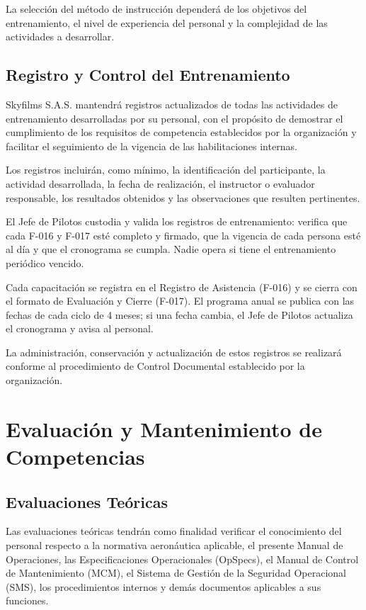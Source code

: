 La selección del método de instrucción dependerá de los objetivos del entrenamiento, el nivel de experiencia del personal y la complejidad de las actividades a desarrollar.




\subsection{Registro y Control del Entrenamiento}

Skyfilms S.A.S. mantendrá registros actualizados de todas las actividades de entrenamiento desarrolladas por su personal, con el propósito de demostrar el cumplimiento de los requisitos de competencia establecidos por la organización y facilitar el seguimiento de la vigencia de las habilitaciones internas.

Los registros incluirán, como mínimo, la identificación del participante, la actividad desarrollada, la fecha de realización, el instructor o evaluador responsable, los resultados obtenidos y las observaciones que resulten pertinentes.

El Jefe de Pilotos custodia y valida los registros de entrenamiento: verifica que cada F-016 y F-017 esté completo y firmado, que la vigencia de cada persona esté al día y que el cronograma se cumpla. Nadie opera si tiene el entrenamiento periódico vencido.

Cada capacitación se registra en el Registro de Asistencia (F-016) y se cierra con el formato de Evaluación y Cierre (F-017). El programa anual se publica con las fechas de cada ciclo de 4 meses; si una fecha cambia, el Jefe de Pilotos actualiza el cronograma y avisa al personal.

La administración, conservación y actualización de estos registros se realizará conforme al procedimiento de Control Documental establecido por la organización.


\section{Evaluación y Mantenimiento de Competencias}

\subsection{Evaluaciones Teóricas}

Las evaluaciones teóricas tendrán como finalidad verificar el conocimiento del personal respecto a la normativa aeronáutica aplicable, el presente Manual de Operaciones, las Especificaciones Operacionales (OpSpecs), el Manual de Control de Mantenimiento (MCM), el Sistema de Gestión de la Seguridad Operacional (SMS), los procedimientos internos y demás documentos aplicables a sus funciones.

